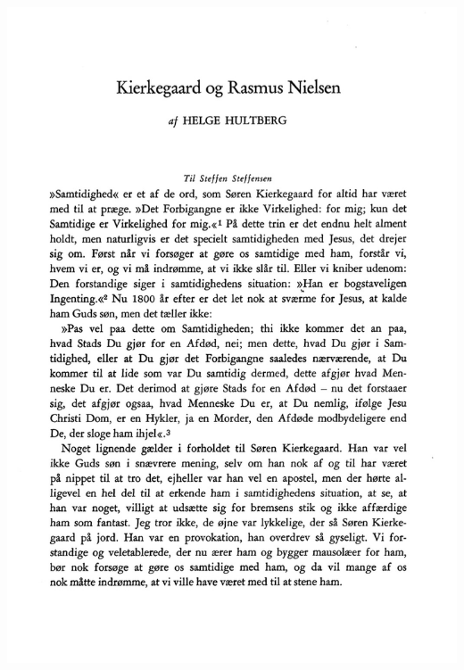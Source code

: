 \documentclass{beamer}
\begin{document}
\begin{frame}{50}
\includegraphics[width=0.9\linewidth]{slide50_img14.jpg}
\end{frame}
\begin{frame}{51}
\end{frame}
\end{document}
